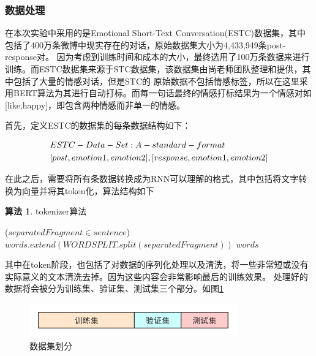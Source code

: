 \documentclass[supercite]{HustGraduPaper}
\theoremstyle{definition}
\newtheorem{alg}{算法}[section]
\begin{document}
\subsubsection{数据处理}
在本次实验中采用的是Emotional Short-Text Conversation(ESTC)数据集，其中包括了400万条微博中现实存在的对话，原始数据集大小为4,433,949条post-response对。
因为考虑到训练时间和成本的大小，最终选用了100万条数据来进行训练。而ESTC数据集来源于STC数据集，该数据集由尚老师团队整理和提供，其中包括了大量的情感对话，但是STC的
原始数据不包括情感标签，所以在这里采用BERT算法为其进行自动打标。而每一句话最终的情感打标结果为一个情感对如[like,happy]，即包含两种情感而非单一的情感。

首先，定义ESTC的数据集的每条数据结构如下：
\begin{shaded*}
  \begin{align}
    &ESTC-Data-Set:A-standard-format\\\notag
    &[post, emotion 1, emotion 2],[response, emotion 1, emotion 2]\notag
  \end{align}
\end{shaded*}

在此之后，需要将所有条数据转换成为RNN可以理解的格式，其中包括将文字转换为向量并将其token化，算法结构如下
\begin{shaded*}
  \begin{alg}{tokenizer算法}
  \label{alg:tok}
  \begin{algorithmic}
    \For ($separatedFragment \in sentence$)
        \State $words.extend(WORDSPLIT.split(separatedFragment))$
    \EndFor
    \State \Return $words$
    \EndProcedure
  \end{algorithmic}
  \end{alg}
\end{shaded*}


其中在token阶段，也包括了对数据的序列化处理以及清洗，将一些非常短或没有实际意义的文本清洗去掉。因为这些内容会非常影响最后的训练效果。
处理好的数据将会被分为训练集、验证集、测试集三个部分。如图\ref{Fig.data}
\begin{figure}[H] %
  \centering %
  \includegraphics[width=0.8\textwidth]{images/data.png} %
  \caption{数据集划分} %
  \label{Fig.data} %
\end{figure}
\end{document}
